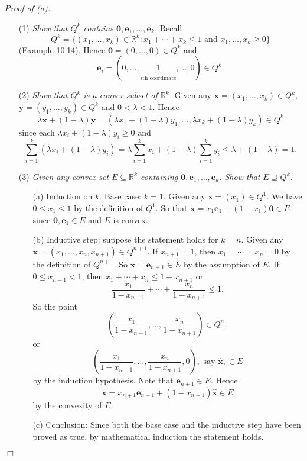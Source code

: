 \documentclass{article}
\begin{document}
\emph{Proof of (a).}
\begin{enumerate}
\item[(1)]
  \emph{Show that $Q^k$ contains $\mathbf{0}, \mathbf{e}_1, \ldots, \mathbf{e}_k$.}
  Recall
  \[
    Q^k = \{ (x_1,\ldots,x_k) \in \mathbb{R}^k :
      x_1 + \cdots + x_k \leq 1 \text{ and }
      x_1, \ldots, x_k \geq 0 \}
  \]
  (Example 10.14).
  Hence $\mathbf{0} = (0,\ldots,0) \in Q^k$ and
  \[
    \mathbf{e}_i = (0,\ldots,\underbrace{1}_{\text{$i$th coordinate}},\ldots,0) \in Q^k.
  \]

\item[(2)]
  \emph{Show that $Q^k$ is a convex subset of $\mathbb{R}^k$.}
  Given any $\mathbf{x} = (x_1,\ldots,x_k) \in Q^k$,
  $\mathbf{y} = (y_1,\ldots,y_k) \in Q^k$ and $0 < \lambda < 1$.
  Hence
  \[
    \lambda \mathbf{x} + (1-\lambda) \mathbf{y}
    = (\lambda x_1 + (1-\lambda)y_1, \ldots, \lambda x_k + (1-\lambda)y_k) \in Q^k
  \]
  since each $\lambda x_i + (1-\lambda)y_i \geq 0$
  and
  \[
    \sum_{i=1}^{k} (\lambda x_i + (1-\lambda)y_i)
    = \lambda \sum_{i=1}^{k} x_i + (1-\lambda) \sum_{i=1}^{k} y_i
    \leq \lambda + (1-\lambda)
    = 1.
  \]

\item[(3)]
  \emph{Given any convex set $E \subseteq \mathbb{R}^k$ containing
  $\mathbf{0}, \mathbf{e}_1, \ldots, \mathbf{e}_k$.
  Show that $E \supseteq Q^k$.}
  \begin{enumerate}
  \item[(a)]
    Induction on $k$.
    Base case: $k = 1$. Given any $\mathbf{x} = (x_1) \in Q^1$.
    We have $0 \leq x_1 \leq 1$ by the definition of $Q^1$.
    So that $\mathbf{x} = x_1 \mathbf{e}_1 + (1-x_1) \mathbf{0} \in E$
    since $\mathbf{0}, \mathbf{e}_1 \in E$ and $E$ is convex.

  \item[(b)]
    Inductive step: suppose the statement holds for $k = n$.
    Given any $\mathbf{x} = (x_1,\ldots,x_n,x_{n+1}) \in Q^{n+1}$.
    If $x_{n+1} = 1$, then $x_1 = \cdots = x_n = 0$ by the definition of $Q^{n+1}$.
    So $\mathbf{x} = \mathbf{e}_{n+1} \in E$ by the assumption of $E$.
    If $0 \leq x_{n+1} < 1$, then $x_1 + \cdots + x_n \leq 1 - x_{n+1}$ or
    \[
      \frac{x_1}{1-x_{n+1}} + \cdots + \frac{x_{n}}{1-x_{n+1}} \leq 1.
    \]
    So the point
    \[
      \left( \frac{x_1}{1-x_{n+1}}, \ldots, \frac{x_{n}}{1-x_{n+1}} \right)
      \in Q^n,
    \]
    or
    \[
      \left( \frac{x_1}{1-x_{n+1}}, \ldots, \frac{x_{n}}{1-x_{n+1}}, 0 \right),
      \text{ say } \widehat{\mathbf{x}}, \in E
    \]
    by the induction hypothesis.
    Note that $\mathbf{e}_{n+1} \in E$.
    Hence
    \[
      \mathbf{x}
      = x_{n+1} \mathbf{e}_{n+1} + (1-x_{n+1})\widehat{\mathbf{x}}
      \in E
    \]
    by the convexity of $E$.

  \item[(c)]
    Conclusion: Since both the base case and the inductive step have been proved as true,
    by mathematical induction the statement holds.
  \end{enumerate}
\end{enumerate}
$\Box$ \\
\end{document}
